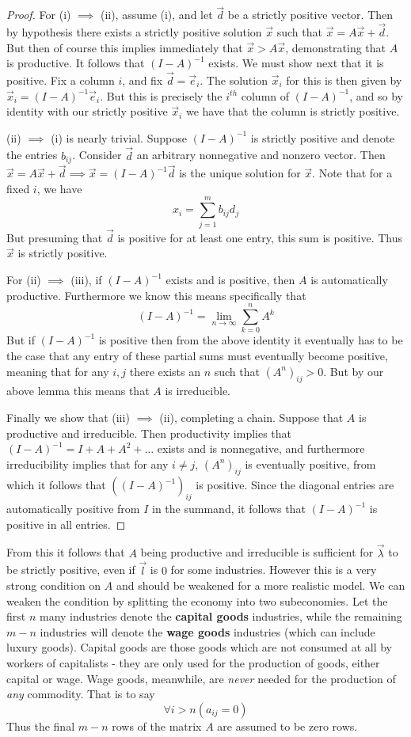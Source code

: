 \documentclass{article}
\theoremstyle{definition}
\theoremstyle{plain}
\theoremstyle{theorem}
\begin{document}
\begin{proof}
	For (i) $\implies$ (ii), assume (i), and let $\vec{d}$ be a strictly positive vector. Then by hypothesis there exists a strictly positive solution $\vec{x}$ such that $\vec{x} = A\vec{x} + \vec{d}$. But then of course this implies immediately that $\vec{x} > A\vec{x}$, demonstrating that $A$ is productive. It follows that $(I-A)^{-1}$ exists. We must show next that it is positive. Fix a column $i$, and fix $\vec{d} = \vec{e}_i$. The solution $\vec{x}_i$ for this is then given by $\vec{x}_i = (I-A)^{-1}\vec{e}_i$. But this is precisely the $i^{th}$ column of $(I-A)^{-1}$, and so by identity with our strictly positive $\vec{x}_i$ we have that the column is strictly positive. \par 
	(ii) $\implies$ (i) is nearly trivial. Suppose $(I-A)^{-1}$ is strictly positive and denote the entries $b_{ij}$. Consider $\vec{d}$ an arbitrary nonnegative and nonzero vector. Then $\vec{x} = A\vec{x} + \vec{d} \implies \vec{x} = (I-A)^{-1}\vec{d}$ is the unique solution for $\vec{x}$. Note that for a fixed $i$, we have
	\[ x_i = \sum_{j=1}^m b_{ij}d_j \]
But presuming that $\vec{d}$ is positive for at least one entry, this sum is positive. Thus $\vec{x}$ is strictly positive. \par 
For (ii) $\implies$ (iii), if $(I-A)^{-1}$ exists and is positive, then $A$ is automatically productive. Furthermore we know this means specifically that
\[ (I-A)^{-1} = \lim_{n \to \infty} \sum_{k=0}^n A^k \]
But if $(I-A)^{-1}$ is positive then from the above identity it eventually has to be the case that any entry of these partial sums must eventually become positive, meaning that for any $i,j$ there exists an $n$ such that $(A^n)_{ij} > 0$. But by our above lemma this means that $A$ is irreducible. \par 
Finally we show that (iii) $\implies$ (ii), completing a chain. Suppose that $A$ is productive and irreducible. Then productivity implies that $(I-A)^{-1} = I+A+A^2+\ldots$ exists and is nonnegative, and furthermore irreducibility implies that for any $i \neq j$, $(A^n)_{ij}$ is eventually positive, from which it follows that $((I-A)^{-1})_{ij}$ is positive. Since the diagonal entries are automatically positive from $I$ in the summand, it follows that $(I-A)^{-1}$ is positive in all entries. 
\end{proof}
From this it follows that $A$ being productive and irreducible is sufficient for $\vec{\lambda}$ to be strictly positive, even if $\vec{l}$ is $0$ for some industries. However this is a very strong condition on $A$ and should be weakened for a more realistic model. We can weaken the condition by splitting the economy into two subeconomies. Let the first $n$ many industries denote the \textbf{capital goods} industries, while the remaining $m-n$ industries will denote the \textbf{wage goods} industries (which can include luxury goods). Capital goods are those goods which are not consumed at all by workers of capitalists - they are only used for the production of goods, either capital or wage. Wage goods, meanwhile, are \emph{never} needed for the production of \emph{any} commodity. That is to say
\[ \forall i > n (a_{ij} = 0) \]
Thus the final $m-n$ rows of the matrix $A$ are assumed to be zero rows. 
\end{document}
